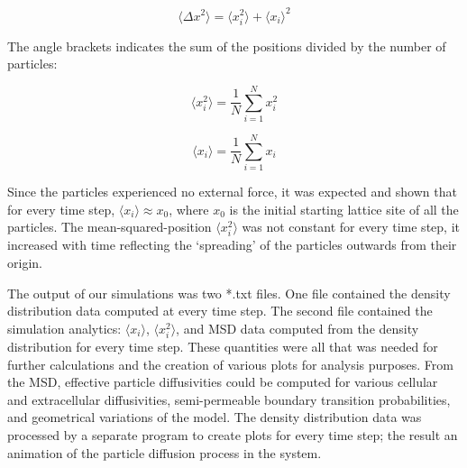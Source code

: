 	\begin{equation}
		\langle \Delta x^2 \rangle = \langle x_{i}^2 \rangle + \langle x_i \rangle^2
	\end{equation}
	
	The angle brackets indicates the sum of the positions divided by the number of particles:
	
	\begin{equation}
		\langle x_{i}^2 \rangle = \dfrac{1}{N}\sum_{i=1}^{N} x_{i}^2
	\end{equation}
	
	\begin{equation}
		\langle x_{i} \rangle = \dfrac{1}{N}\sum_{i=1}^{N} x_i
	\end{equation}
	
	Since the particles experienced no external force, it was expected and shown that for every time step, $ \langle x_{i} \rangle \approx x_0 $, where $ x_0 $ is the initial starting lattice site of all the particles. The mean-squared-position $ \langle x_{i}^2 \rangle $ was not constant for every time step, it increased with time reflecting the `spreading' of the particles outwards from their origin.
	
%	
%	
%	
%	
	
	The output of our simulations was two *.txt files. One file contained the density distribution data computed at every time step. The second file contained the simulation analytics: $ \langle x_{i} \rangle $, $ \langle x_{i}^2 \rangle $, and MSD data computed from the density distribution for every time step. These quantities were all that was needed for further calculations and the creation of various plots for analysis purposes. From the MSD, effective particle diffusivities could be computed for various cellular and extracellular diffusivities, semi-permeable boundary transition probabilities, and geometrical variations of the model. The density distribution data was processed by a separate program to create plots for every time step; the result an animation of the particle diffusion process in the system.
	
